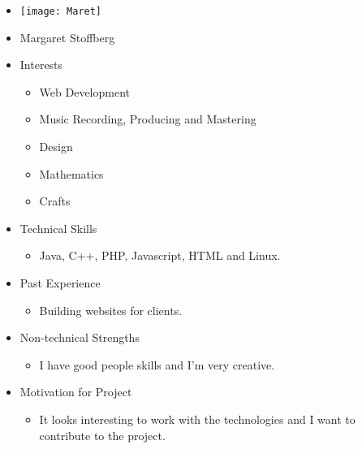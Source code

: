 
\begin{itemize}
	\item[] \texttt{[image: Maret]}
	\item[] Margaret Stoffberg
	\item Interests
	\begin{itemize}
		\item Web Development
		\item Music Recording, Producing and Mastering
		\item Design
		\item Mathematics
		\item Crafts
	\end{itemize}
	\item Technical Skills
	\begin{itemize}
		\item[] Java, C++, PHP, Javascript, HTML and Linux.
	\end{itemize}
	\item Past Experience
	\begin{itemize}
		\item[] Building websites for clients.
	\end{itemize}
	\item Non-technical Strengths
	\begin{itemize}
		\item[] I have good people skills and I'm very creative.
	\end{itemize}
	\item Motivation for Project
	\begin{itemize}
		\item[] It looks interesting to work with the technologies and I want to contribute to the project.
	\end{itemize}
\end{itemize}
